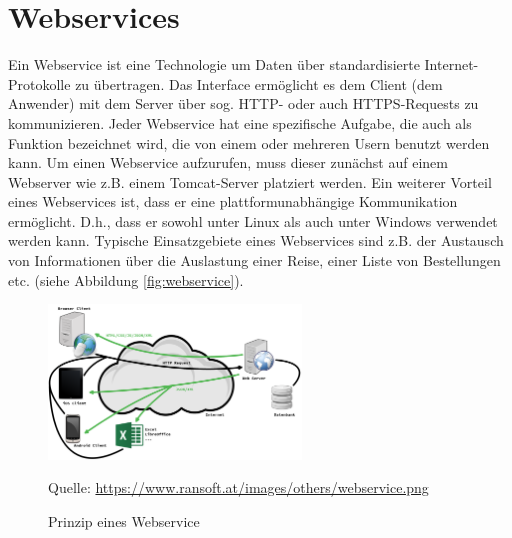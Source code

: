 \section{Webservices}
\label{sec:Webservices}
Ein Webservice ist eine Technologie um Daten über standardisierte Internet-Protokolle zu übertragen.
Das Interface ermöglicht es dem Client (dem Anwender) mit dem Server über sog. \acs{HTTP}- oder auch \acs{HTTPS}-Requests zu kommunizieren.
Jeder Webservice hat eine spezifische Aufgabe, die auch als Funktion bezeichnet wird, die von einem oder mehreren Usern benutzt werden kann.
Um einen Webservice aufzurufen, muss dieser zunächst auf einem Webserver wie z.B. einem Tomcat-Server platziert werden.
Ein weiterer Vorteil eines Webservices ist, dass er eine plattformunabhängige Kommunikation ermöglicht.
D.h., dass er sowohl unter Linux als auch unter Windows verwendet werden kann.
Typische Einsatzgebiete eines Webservices sind z.B. der Austausch von Informationen über die Auslastung einer Reise, einer Liste von Bestellungen etc. (siehe Abbildung \vref{fig:webservice}).

\begin{figure}[h]
	\centering 
	\includegraphics[width=0.6\textwidth]{img/webservice.png}
	\captionsetup{format=hang}
	\caption{Prinzip eines Webservice}
	\small Quelle: \url{https://www.ransoft.at/images/others/webservice.png}
	\label{fig:webservice}
\end{figure}